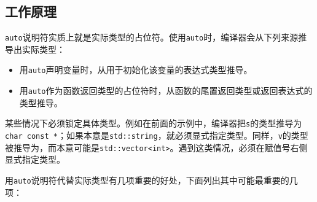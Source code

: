 
\subsection{工作原理}



\texttt{auto}说明符实质上就是实际类型的占位符。使用\texttt{auto}时，编译器会从下列来源推导出实际类型：



\begin{itemize}
\item 用\texttt{auto}声明变量时，从用于初始化该变量的表达式类型推导。



\item 用\texttt{auto}作为函数返回类型的占位符时，从函数的尾置返回类型或返回表达式的类型推导。

\end{itemize}



某些情况下必须锁定具体类型。例如在前面的示例中，编译器把\texttt{s}的类型推导为\texttt{char const *}；如果本意是\texttt{std::\allowbreak{}string}，就必须显式指定类型。同样，\texttt{v}的类型被推导为，而本意可能是\texttt{std::\allowbreak{}vector<\allowbreak{}int>}。遇到这类情况，必须在赋值号右侧显式指定类型。



用\texttt{auto}说明符代替实际类型有几项重要的好处，下面列出其中可能最重要的几项：



